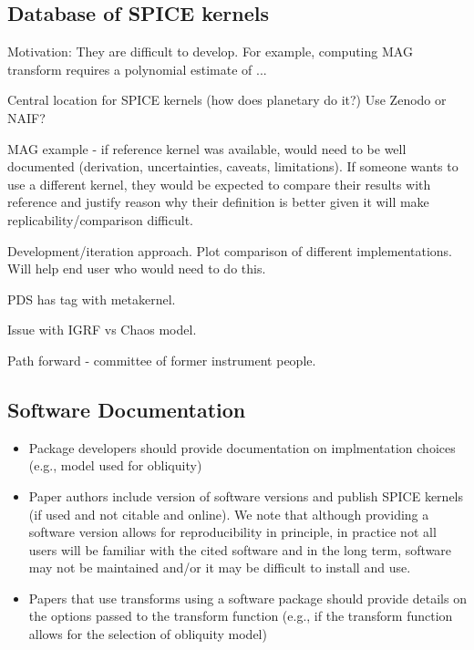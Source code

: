 \documentclass[draft]{agujournal2019}
\begin{document}
\subsection{Database of SPICE kernels}

Motivation: They are difficult to develop. For example, computing MAG transform requires a polynomial estimate of ...




Central location for SPICE kernels (how does planetary do it?) Use Zenodo or NAIF?

MAG example - if reference kernel was available, would need to be well documented (derivation, uncertainties, caveats, limitations). If someone wants to use a different kernel, they would be expected to compare their results with reference and justify reason why their definition is better given it will make replicability/comparison difficult.

Development/iteration approach. Plot comparison of different implementations. Will help end user who would need to do this.

PDS has tag with metakernel.

Issue with IGRF vs Chaos model.

Path forward - committee of former instrument people.

\subsection{Software Documentation}

\begin{itemize}

  \item Package developers should provide documentation on implmentation choices (e.g., model used for obliquity)
  \item Paper authors include version of software versions and publish SPICE kernels (if used and not citable and online). We note that although providing a software version allows for reproducibility in principle, in practice not all users will be familiar with the cited software and in the long term, software may not be maintained and/or it may be difficult to install and use. 
  \item Papers that use transforms using a software package should provide details on the options passed to the transform function (e.g., if the transform function allows for the selection of obliquity model)

\end{itemize}


\end{document}
